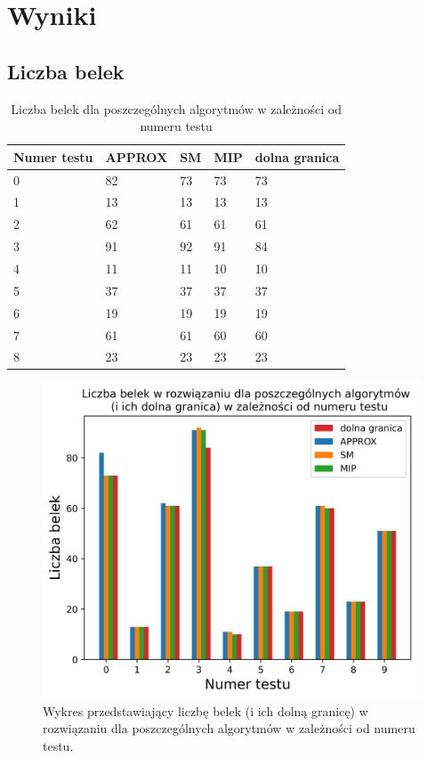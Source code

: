 \section{Wyniki}
\subsection{Liczba belek}

\begin{table}[H] 
	\begin{center}
		\begin{tabular}{|p{2cm}|p{2cm}|p{2cm}|p{2cm}|p{2cm}| } \hline
			Numer testu & APPROX & SM & MIP & dolna granica\\ \hline
			0 & 82 & 73 & 73 & 73\\ 
			1 & 13 & 13 & 13 & 13\\ 
			2 & 62 & 61 & 61 & 61\\ 
			3 & 91 & 92 & 91 & 84\\ 
			4 & 11 & 11 & 10 & 10\\ 
			5 & 37 & 37 & 37 & 37\\ 
			6 & 19 & 19 & 19 & 19\\ 
			7 & 61 & 61 & 60 & 60\\ 
			8 & 23 & 23 & 23 & 23\\ 
			\hline
		\end{tabular}
		\caption{Liczba belek dla poszczególnych algorytmów w zależności od numeru testu}
	\end{center}
\end{table}

\begin{figure}[H]
	\begin{center}
	\includegraphics[width=12cm]{plots/res}
	\caption{Wykres przedstawiający liczbę belek (i ich dolną granicę) w rozwiązaniu dla poszczególnych algorytmów w zależności od numeru testu.}
	\end{center}
\end{figure}

